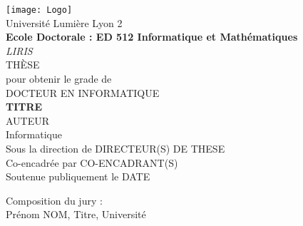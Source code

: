 \begin{titlepage}
\begin{center}
%
\texttt{[image: Logo]}
%
\\
\vspace*{1cm}
%
{\Large
Université Lumière Lyon 2
} \\
%
{\large
\textbf{Ecole Doctorale : ED 512 Informatique et Mathématiques} \\
\textit{LIRIS}\\
}
%
\vspace*{1cm}
{\Large
\MakeUppercase{Thèse}\\
pour obtenir le grade de\\
\MakeUppercase{Docteur en informatique}\\
}
\vspace*{1.5cm}
{\LARGE
\textbf{TITRE}
} \\
%
%
\vspace{1.5cm}
%
{\Large
AUTEUR \\
}
%
\vspace{1.5cm}
%
{\large
Informatique \\
}
%
\vspace{1cm}
{\normalsize
Sous la direction de DIRECTEUR(S) DE THESE \\
Co-encadrée par CO-ENCADRANT(S) \\
}
%
\vfill
%
{
Soutenue publiquement le DATE \\
}
%
\end{center}
%
\vspace{0.5cm}
\noindent Composition du jury : \\
Prénom NOM, Titre, Université \\

\end{titlepage}




